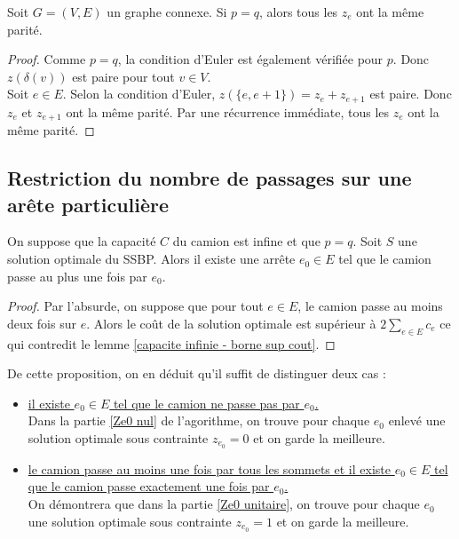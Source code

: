 \begin{prop}\label{parité des Ze}
Soit $G=(V,E)$ un graphe connexe. Si $p=q$, alors tous les $z_e$ ont la même parité.
\end{prop}

\begin{proof}
Comme $p=q$, la condition d'Euler est également vérifiée pour $p$. Donc $z(\delta(v))$ est paire pour tout $v \in V$.\\
Soit $e \in E$. Selon la condition d'Euler, $z(\{e, e+1\}) = z_e + z_{e+1}$ est paire. Donc $z_e$ et $z_{e+1}$ ont la même parité. Par une récurrence immédiate, tous les $z_e$ ont la même parité.
\end{proof}

\subsection{Restriction du nombre de passages sur une arête particulière}

\begin{prop}
On suppose que la capacité $C$ du camion est infine et que $p=q$. Soit $S$ une solution optimale du SSBP. Alors il existe une arrête $e_0 \in E$ tel que le camion passe au plus une fois par $e_0$.
\end{prop}

\begin{proof}
Par l'absurde, on suppose que pour tout $e \in E$, le camion passe au moins deux fois sur $e$. Alors le coût de la solution optimale est supérieur à $2\sum_{e \in E}c_e$ ce qui contredit le lemme \ref{capacite infinie - borne sup cout}.
\end{proof}

De cette proposition, on en déduit qu'il suffit de distinguer deux cas :
\begin{itemize}
\item \uline{il existe $e_0 \in E$ tel que le camion ne passe pas par $e_0$.}\\
Dans la partie \ref{Ze0 nul} de l'agorithme, on trouve pour chaque $e_0$ enlevé une solution optimale sous contrainte $z_{e_0} = 0$ et on garde la meilleure.
\item \uline{le camion passe au moins une fois par tous les sommets et il existe $e_0 \in E$ tel que le camion passe exactement une fois par $e_0$.}\\
On démontrera que dans la partie \ref{Ze0 unitaire}, on trouve pour chaque $e_0$ une solution optimale sous contrainte $z_{e_0} = 1$ et on garde la meilleure.
\end{itemize}

